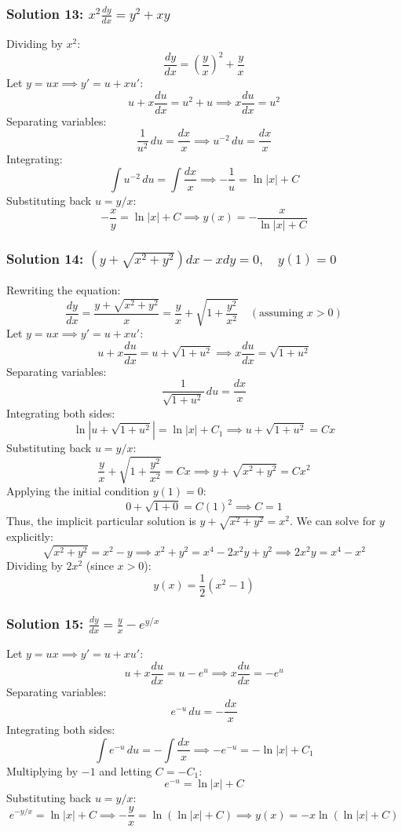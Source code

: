\documentclass[11pt,letterpaper]{article}
\begin{document}
\subsubsection*{Solution 13: $x^2 \frac{dy}{dx} = y^2 + xy$}
Dividing by $x^2$:
\[ \frac{dy}{dx} = \left(\frac{y}{x}\right)^2 + \frac{y}{x} \]
Let $y = ux \implies y' = u + x u'$:
\[ u + x\frac{du}{dx} = u^2 + u \implies x\frac{du}{dx} = u^2 \]
Separating variables:
\[ \frac{1}{u^2} \, du = \frac{dx}{x} \implies u^{-2} \, du = \frac{dx}{x} \]
Integrating:
\[ \int u^{-2} \, du = \int \frac{dx}{x} \implies -\frac{1}{u} = \ln|x| + C \]
Substituting back $u = y/x$:
\[ -\frac{x}{y} = \ln|x| + C \implies y(x) = -\frac{x}{\ln|x|+C} \]

\subsubsection*{Solution 14: $(y + \sqrt{x^2+y^2})dx - x dy = 0, \quad y(1) = 0$}
Rewriting the equation:
\[ \frac{dy}{dx} = \frac{y + \sqrt{x^2+y^2}}{x} = \frac{y}{x} + \sqrt{1 + \frac{y^2}{x^2}} \quad (\text{assuming } x > 0) \]
Let $y = ux \implies y' = u + x u'$:
\[ u + x\frac{du}{dx} = u + \sqrt{1+u^2} \implies x\frac{du}{dx} = \sqrt{1+u^2} \]
Separating variables:
\[ \frac{1}{\sqrt{1+u^2}} \, du = \frac{dx}{x} \]
Integrating both sides:
\[ \ln| u + \sqrt{1+u^2} | = \ln|x| + C_1 \implies u + \sqrt{1+u^2} = C x \]
Substituting back $u = y/x$:
\[ \frac{y}{x} + \sqrt{1 + \frac{y^2}{x^2}} = C x \implies y + \sqrt{x^2+y^2} = C x^2 \]
Applying the initial condition $y(1) = 0$:
\[ 0 + \sqrt{1 + 0} = C(1)^2 \implies C = 1 \]
Thus, the implicit particular solution is $y + \sqrt{x^2+y^2} = x^2$. We can solve for $y$ explicitly:
\[ \sqrt{x^2+y^2} = x^2 - y \implies x^2 + y^2 = x^4 - 2x^2 y + y^2 \implies 2x^2 y = x^4 - x^2 \]
Dividing by $2x^2$ (since $x > 0$):
\[ y(x) = \frac{1}{2}(x^2 - 1) \]

\subsubsection*{Solution 15: $\frac{dy}{dx} = \frac{y}{x} - e^{y/x}$}
Let $y = ux \implies y' = u + x u'$:
\[ u + x\frac{du}{dx} = u - e^u \implies x\frac{du}{dx} = -e^u \]
Separating variables:
\[ e^{-u} \, du = -\frac{dx}{x} \]
Integrating both sides:
\[ \int e^{-u} \, du = -\int \frac{dx}{x} \implies -e^{-u} = -\ln|x| + C_1 \]
Multiplying by $-1$ and letting $C = -C_1$:
\[ e^{-u} = \ln|x| + C \]
Substituting back $u = y/x$:
\[ e^{-y/x} = \ln|x| + C \implies -\frac{y}{x} = \ln(\ln|x| + C) \implies y(x) = -x\ln(\ln|x| + C) \]
\end{document}
